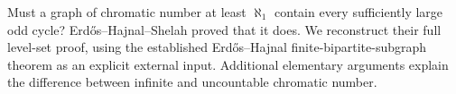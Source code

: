 Must a graph of chromatic number at least $\aleph_1$ contain every sufficiently large odd cycle? Erd\H{o}s--Hajnal--Shelah proved that it does. We reconstruct their full level-set proof, using the established Erd\H{o}s--Hajnal finite-bipartite-subgraph theorem as an explicit external input. Additional elementary arguments explain the difference between infinite and uncountable chromatic number.
